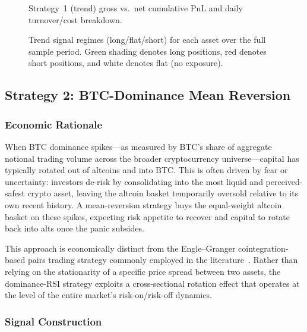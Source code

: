 \documentclass[11pt,a4paper]{article}
\begin{document}
\begin{figure}[H]
  \centering
  \caption{Strategy~1 (trend) gross vs.\ net cumulative PnL and daily turnover/cost breakdown.}
  \label{fig:trend-equity}
\end{figure}

\begin{figure}[H]
  \centering
  \caption{Trend signal regimes (long/flat/short) for each asset over the full sample period.  Green shading denotes long positions, red denotes short positions, and white denotes flat (no exposure).}
  \label{fig:trend-regimes}
\end{figure}

\subsection{Strategy 2: BTC-Dominance Mean Reversion}
\label{sec:domrsi}

\subsubsection{Economic Rationale}

When BTC dominance spikes---as measured by BTC's share of aggregate notional trading volume across the broader cryptocurrency universe---capital has typically rotated out of altcoins and into BTC.  This is often driven by fear or uncertainty: investors de-risk by consolidating into the most liquid and perceived-safest crypto asset, leaving the altcoin basket temporarily oversold relative to its own recent history.  A mean-reversion strategy buys the equal-weight altcoin basket on these spikes, expecting risk appetite to recover and capital to rotate back into alts once the panic subsides.

This approach is economically distinct from the Engle--Granger cointegration-based pairs trading strategy commonly employed in the literature~\cite{engle1987}.  Rather than relying on the stationarity of a specific price spread between two assets, the dominance-RSI strategy exploits a cross-sectional rotation effect that operates at the level of the entire market's risk-on/risk-off dynamics.

\subsubsection{Signal Construction}
\end{document}

